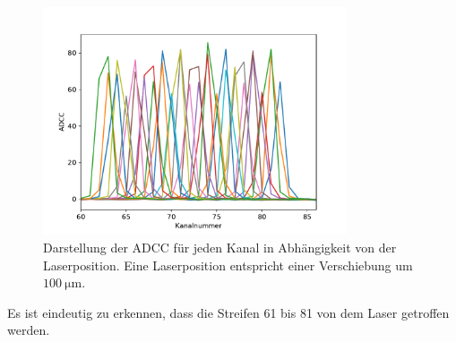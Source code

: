 \begin{figure}
  \centering
  \includegraphics[width=0.8\textwidth]{plots/Position_Kanal_Signal_Plot.pdf}
  \caption{Darstellung der ADCC für jeden Kanal in Abhängigkeit von der Laserposition. Eine Laserposition entspricht einer Verschiebung um $\SI{100}{\micro\meter}$.}
  \label{fig:Position}
\end{figure}
\FloatBarrier
Es ist eindeutig zu erkennen, dass die Streifen 61 bis 81 von dem Laser getroffen werden.

